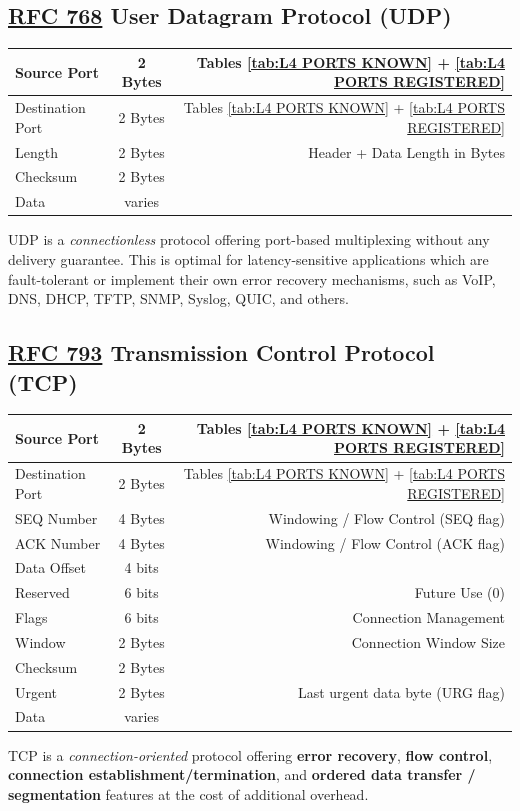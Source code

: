 \documentclass[12pt]{article}
\newcommand{\RFC}[1]{\href{https://datatracker.ietf.org/doc/html/rfc#1}{RFC #1}}
\begin{document}
	\subsection[RFC 768 UDP]{\RFC{768} User Datagram Protocol (UDP) \label{subsec:UDP}}
	\begin{table}[H]
	\centering
	\begin{tabular}{| l | c | r |}
	\hline
	Source Port		& 2 Bytes	& Tables \ref{tab:L4 PORTS KNOWN} + \ref{tab:L4 PORTS REGISTERED}\\\hline
	Destination Port	& 2 Bytes	& Tables \ref{tab:L4 PORTS KNOWN} + \ref{tab:L4 PORTS REGISTERED}\\\hline
	Length		& 2 Bytes	& Header + Data Length in Bytes\\\hline
	Checksum		& 2 Bytes	&\\\hline
	Data			& varies	&\\\hline
	\end{tabular}\end{table}
	UDP is a \textit{connectionless} protocol offering port-based multiplexing without any delivery guarantee. This is optimal for latency-sensitive applications which are fault-tolerant or implement their own error recovery mechanisms, such as VoIP, DNS, DHCP, TFTP, SNMP, Syslog, QUIC, and others.


	\subsection[RFC 793 TCP]{\RFC{793} Transmission Control Protocol (TCP) \label{subsec:TCP}}
	\begin{table}[H]
	\centering
	\begin{tabular}{| l | c | r |}
	\hline
	Source Port		& 2 Bytes	& Tables \ref{tab:L4 PORTS KNOWN} + \ref{tab:L4 PORTS REGISTERED}\\\hline
	Destination Port	& 2 Bytes	& Tables \ref{tab:L4 PORTS KNOWN} + \ref{tab:L4 PORTS REGISTERED}\\\hline
	SEQ Number	& 4 Bytes	& Windowing / Flow Control (SEQ flag)\\\hline
	ACK Number	& 4 Bytes	& Windowing / Flow Control (ACK flag)\\\hline
	Data Offset		& 4 bits	&\\\hline
	Reserved		& 6 bits	& Future Use (0)\\\hline
	Flags			& 6 bits	& Connection Management\\\hline
	Window		& 2 Bytes	& Connection Window Size\\\hline
	Checksum		& 2 Bytes	&\\\hline
	Urgent		& 2 Bytes	& Last urgent data byte (URG flag)\\\hline
	Data			& varies	&\\\hline
	\end{tabular}\end{table}
	TCP is a \textit{connection-oriented} protocol offering \textbf{error recovery}, \textbf{flow control}, \textbf{connection establishment/termination}, and \textbf{ordered data transfer / segmentation} features at the cost of additional overhead.
\end{document}
